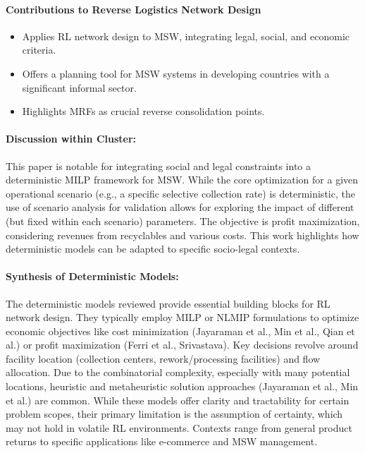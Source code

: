 \paragraph{Contributions to Reverse Logistics Network Design}
\begin{itemize}
    \item Applies RL network design to MSW, integrating legal, social, and economic criteria.
    \item Offers a planning tool for MSW systems in developing countries with a significant informal sector.
    \item Highlights MRFs as crucial reverse consolidation points.
\end{itemize}
\paragraph{Discussion within Cluster:} This paper is notable for integrating social and legal constraints into a deterministic MILP framework for MSW. While the core optimization for a given operational scenario (e.g., a specific selective collection rate) is deterministic, the use of scenario analysis for validation allows for exploring the impact of different (but fixed within each scenario) parameters. The objective is profit maximization, considering revenues from recyclables and various costs. This work highlights how deterministic models can be adapted to specific socio-legal contexts.

\paragraph{Synthesis of Deterministic Models:}
The deterministic models reviewed provide essential building blocks for RL network design. They typically employ MILP or NLMIP formulations to optimize economic objectives like cost minimization (Jayaraman et al., Min et al., Qian et al.) or profit maximization (Ferri et al., Srivastava). Key decisions revolve around facility location (collection centers, rework/processing facilities) and flow allocation. Due to the combinatorial complexity, especially with many potential locations, heuristic and metaheuristic solution approaches (Jayaraman et al., Min et al.) are common. While these models offer clarity and tractability for certain problem scopes, their primary limitation is the assumption of certainty, which may not hold in volatile RL environments. Contexts range from general product returns to specific applications like e-commerce and MSW management.


